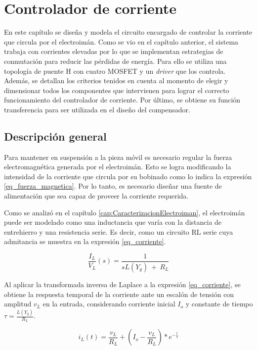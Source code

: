 \chapter{Controlador de corriente}  \label{cap:ControladorCorriente}

En este capítulo se diseña y modela el circuito encargado de controlar la corriente que circula por el electroimán. Como se vio en el capítulo anterior, el sistema trabaja con corrientes elevadas por lo que se implementan estrategias de conmutación para reducir las pérdidas de energía. Para ello se utiliza una topología de puente H con cuatro MOSFET y un \textsl{driver} que los controla. Además, se detallan los criterios tenidos en cuenta al momento de  elegir  y dimensionar todos los componentes que intervienen para lograr el correcto funcionamiento del controlador de corriente. Por último, se obtiene su función transferencia  para ser utilizada en el diseño del compensador.

\section{Descripción general}\label{sec_descripcion-general}

Para mantener en suspensión a la pieza móvil es necesario regular la fuerza electromagnética generada por el electroimán. Esto se logra modificando la intensidad de la corriente que circula por su bobinado como lo indica la expresión \ref{eq_fuerza_magnetica}. Por lo tanto, es necesario diseñar una fuente de alimentación que sea capaz de proveer la corriente requerida. 

Como se analizó en el capítulo \ref{cap:CaracterizacionElectroiman}, el electroimán puede ser modelado como una inductancia que varía con la distancia de entrehierro y una resistencia serie. Es decir, como un circuito RL serie cuya admitancia se muestra en la expresión \ref{eq_corriente}.

\begin{equation} \label{eq_corriente}
\frac{I_L}{V_L}(s)=\frac{1}{sL(Y_g)\ +\ R_L}
\end{equation}

Al aplicar la transformada inversa de Laplace a la expresión  \ref{eq_corriente}, se obtiene la respuesta temporal de la corriente ante un escalón de tensión con amplitud $v_L$ en la entrada, considerando corriente inicial $I_o$ y constante de tiempo $\tau=\frac{L(Y_g)}{R_L}$.

\begin{equation} \label{eq_corriente_temporal_cond_iniciales}
	i_L(t)=\frac{v_L}{R_L} + (I_o-\frac{v_L}{R_L})*e^{-\frac{t}{\tau}}
\end{equation}

